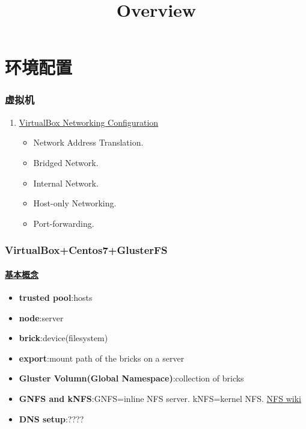 \documentclass{article}
\title{Overview}
\date{}
\begin{document}
\maketitle

\tableofcontents
\newpage
\part{环境配置}
\section{虚拟机}
\begin{enumerate}
\item \href{https://blogs.oracle.com/scoter/networking-in-virtualbox-v2}{VirtualBox Networking Configuration}
\begin{itemize}
\item Network Address Translation.
\item Bridged Network.
\item Internal Network.
\item Host-only Networking.
\item Port-forwarding.
\end{itemize}
\end{enumerate}
\section{VirtualBox+Centos7+GlusterFS}
\subsection{\href{https://docs.gluster.org/en/latest/Install-Guide/Common\_criteria/}{基本概念}}
\begin{itemize}
\item \textbf{trusted pool}:hosts
\item \textbf{node}:server
\item \textbf{brick}:device(filesystem)
\item \textbf{export}:mount path of the bricks on a server
\item \textbf{Gluster Volumn(Global Namespace)}:collection of bricks
\item \textbf{GNFS and kNFS}:GNFS=inline NFS server. kNFS=kernel NFS. \href{https://en.wikipedia.org/wiki/Network\_File\_System}{NFS wiki}
\item \textbf{DNS setup}:????
\end{itemize}
\end{document}
